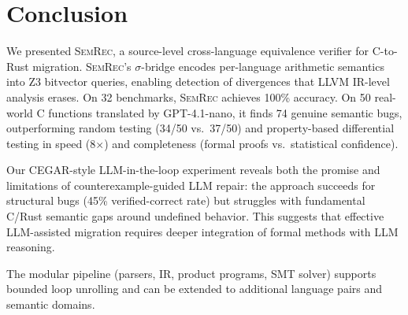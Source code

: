 \documentclass[11pt,a4paper]{article}
\begin{document}
\section{Conclusion}\label{sec:conclusion}

We presented \textsc{SemRec}, a source-level cross-language equivalence
verifier for C-to-Rust migration.  \textsc{SemRec}'s $\sigma$-bridge
encodes per-language arithmetic semantics into Z3 bitvector queries,
enabling detection of divergences that LLVM IR-level analysis erases.
On 32 benchmarks, \textsc{SemRec} achieves 100\% accuracy.
On 50 real-world C functions translated by GPT-4.1-nano, it finds
74 genuine semantic bugs, outperforming random testing (34/50 vs.\ 37/50)
and property-based differential testing in speed (8$\times$) and
completeness (formal proofs vs.\ statistical confidence).

Our CEGAR-style LLM-in-the-loop experiment reveals both the promise
and limitations of counterexample-guided LLM repair: the approach
succeeds for structural bugs (45\% verified-correct rate) but struggles
with fundamental C/Rust semantic gaps around undefined behavior.
This suggests that effective LLM-assisted migration requires deeper
integration of formal methods with LLM reasoning.

The modular pipeline (parsers, IR, product programs, SMT solver)
supports bounded loop unrolling and can be extended to additional
language pairs and semantic domains.
\end{document}
